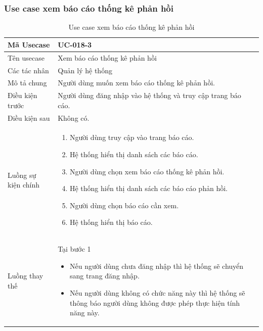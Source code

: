 \documentclass[12pt,a4paper]{article}
\begin{document}
    \subsubsection*{Use case xem báo cáo thống kê phản hồi}
    \begin{table}[H]
        \centering
        \begin{tabular}{|p{3.5cm}|p{11.5cm}|c|}
            \hline
            Mã Usecase & UC-018-3
            \\ \hline
            Tên usecase     & Xem báo cáo thống kê phản hồi                                \\
            \hline
            Các tác nhân    & Quản lý hệ thống                                             \\
            \hline
            Mô tả chung     & Người dùng muốn xem báo cáo thống kê phản hồi.               \\
            \hline

            Điều kiện trước & Người dùng đăng nhập vào hệ thống và truy cập trang báo cáo. \\
            \hline

            Điều kiện sau   & Không có.                                                    \\
            \hline

            Luồng sự kiện chính & \vspace{-.8cm}\begin{enumerate}
                                                    \item Người dùng truy cập vào trang báo cáo.
                                                    \item Hệ thống hiển thị danh sách các báo cáo.
                                                    \item Người dùng chọn xem báo cáo thống kê phản hồi.
                                                    \item Hệ thống hiển thị danh sách các báo cáo phản hồi.
                                                    \item Người dùng chọn báo cáo cần xem.
                                                    \item Hệ thống hiển thị báo cáo.
            \end{enumerate}
            \\
            \hline
            Luồng thay thế & Tại bước 1\newline
            \vspace{-.8cm}\begin{itemize}
                              \item Nếu người dùng chưa đăng nhập thì hệ thống sẽ chuyển sang trang đăng nhập.
                              \item Nếu người dùng không có chức năng này thì hệ thống sẽ thông báo người dùng không được phép thực hiện tính năng này.
            \end{itemize}
            \\ \hline
        \end{tabular}
        \caption{Use case xem báo cáo thống kê phản hồi}


\end{table}
\end{document}
